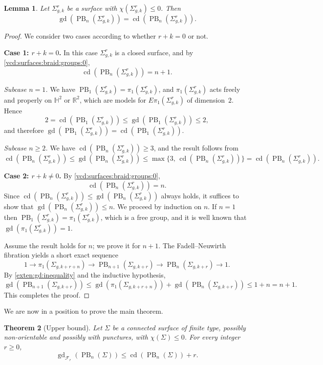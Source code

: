 \documentclass[a4paper,12pt,leqno]{amsart}
\newtheorem{theorem}{Theorem}[section]
\newtheorem{lemma}[theorem]{Lemma}
\theoremstyle{definition}
\newcommand{\calF}{{\mathcal F}}
\DeclareMathOperator{\cd}{cd}
\DeclareMathOperator{\gd}{gd}
\DeclareMathOperator{\pb}{PB}
\begin{document}
\begin{lemma}\label{caso:base:dimension}
Let $\Sigma_{g,k}^r$ be a surface with $\chi(\Sigma_{g,k}^r) \leq 0$. Then
\[
  \gd(\pb_n(\Sigma_{g,k}^r)) = \cd(\pb_n(\Sigma_{g,k}^r)).
\]
\end{lemma}

\begin{proof}
We consider two cases according to whether $r + k = 0$ or not.

\medskip
\noindent\textbf{Case 1: $r + k = 0$.}
In this case $\Sigma_{g,k}^r$ is a closed surface, and by \cref{vcd:surfaces:braid:groups:0},
\[
  \cd(\pb_n(\Sigma_{g,k}^r)) = n + 1.
\]

\noindent\textit{Subcase $n = 1$.}
We have $\pb_1(\Sigma_{g,k}^r) = \pi_1(\Sigma_{g,k}^r)$, and $\pi_1(\Sigma_{g,k}^r)$
acts freely and properly on $\mathbb{H}^2$ or $\mathbb{R}^2$, which are
models for $E\pi_1(\Sigma_{g,k}^r)$ of dimension~$2$. Hence
\[
  2 = \cd(\pb_1(\Sigma_{g,k}^r)) \leq \gd(\pb_1(\Sigma_{g,k}^r)) \leq 2,
\]
and therefore $\gd(\pb_1(\Sigma_{g,k}^r)) = \cd(\pb_1(\Sigma_{g,k}^r))$.

\noindent\textit{Subcase $n \geq 2$.}
We have $\cd(\pb_n(\Sigma_{g,k}^r)) \geq 3$, and the result follows from
\[
  \cd(\pb_n(\Sigma_{g,k}^r)) \leq \gd(\pb_n(\Sigma_{g,k}^r))
  \leq \max\{3,\, \cd(\pb_n(\Sigma_{g,k}^r))\} = \cd(\pb_n(\Sigma_{g,k}^r)).
\]

\medskip
\noindent\textbf{Case 2: $r + k \neq 0$.}
By \cref{vcd:surfaces:braid:groups:0},
\[
  \cd(\pb_n(\Sigma_{g,k}^r)) = n.
\]
Since $\cd(\pb_n(\Sigma_{g,k}^r)) \leq \gd(\pb_n(\Sigma_{g,k}^r))$ always holds,
it suffices to show that $\gd(\pb_n(\Sigma_{g,k}^r)) \leq n$.
We proceed by induction on $n$. If $n = 1$ then $\pb_1(\Sigma_{g,k}^r) = \pi_1(\Sigma_{g,k}^r)$, which is a free group,
and it is well known that $\gd(\pi_1(\Sigma_{g,k}^r)) = 1$.

Assume the result holds for $n$; we prove it for $n+1$.
The Fadell--Neuwirth fibration yields a short exact sequence
\[
  1 \to \pi_1(\Sigma_{g,k+r+n}) \to \pb_{n+1}(\Sigma_{g,k+r})
    \to \pb_n(\Sigma_{g,k+r}) \to 1.
\]
By \cref{exten:gd:inequality} and the inductive hypothesis,
\[
  \gd(\pb_{n+1}(\Sigma_{g,k+r}))
  \leq \gd(\pi_1(\Sigma_{g,k+r+n})) + \gd(\pb_n(\Sigma_{g,k+r}))
  \leq 1 + n = n + 1.
\]
This completes the proof.
\end{proof}
 We are now in a position to prove the main theorem.



\begin{theorem}[Upper bound]\label{upper:bound:gd:fn}
Let $\Sigma$ be a connected surface of finite type, possibly non-orientable
and possibly with punctures, with $\chi(\Sigma) \leq 0$.
For every integer $r \geq 0$,
\[
  \gd_{\calF_r}(\pb_n(\Sigma)) \leq \cd(\pb_n(\Sigma)) + r.
\]
\end{theorem}
\end{document}

